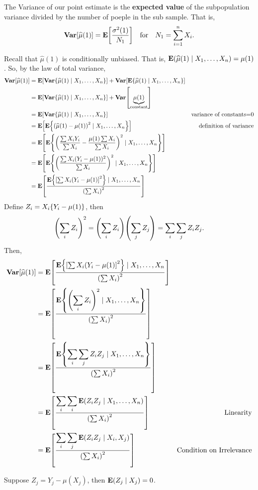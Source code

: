 \begin{clm}
	The Variance of our point estimate is the \textbf{expected value} of the subpopulation variance divided by the number of poeple in the sub sample. That is, \[\vb{Var}\qty[\widehat\mu(1)]=\vb{E}\qty[\dfrac{\sigma^2(1)}{N_1}]\quad\text{for}\quad N_1=\sum_{i=1}^nX_i.\]	
\end{clm}
\begin{prf}
	Recall that $\hat\mu(1)$ is conditionally unbiased. That is, $\vb{E}\qty(\widehat\mu(1)\mid X_1,\dots,X_n)=\mu(1)$. So, by the law of total variance, 
	\begin{align*}
		\vb{Var}\qty[\widehat\mu(1)]&=\vb{E}\qty[\vb{Var}\qty{\widehat\mu(1)\mid X_1,\dots,X_n}]+\vb{Var}\qty[\vb{E}\qty{\widehat\mu(1)\mid X_1,\dots,X_n}]\\
		&=\vb{E}\qty[\vb{Var}\qty{\widehat\mu(1)\mid X_1,\dots,X_n}]+\vb{Var}\qty[\underbrace{\mu(1)}_\text{constant}]\\
		&=\vb{E}\qty[\vb{Var}\qty{\widehat\mu(1)\mid X_1,\dots,X_n}]&\text{variance of constants=0}\\
		&=\vb{E}\qty[\vb{E}\qty{\qty(\widehat\mu(1)-\mu(1))^2\mid X_1,\dots,X_n}]&\text{definition of variance}\\
		&=\vb{E}\qty[\vb{E}\qty{\qty(\dfrac{\sum X_iY_i}{\sum X_i}-\dfrac{\mu(1)\sum X_i}{\sum X_i})^2\mid X_1,\dots,X_n}]\\
		&=\vb{E}\qty[\vb{E}\qty{\qty(\dfrac{\sum X_i(Y_i-\mu(1))^2}{\sum X_i})^2\mid X_1,\dots,X_n}]\\
		&=\vb{E}\qty[\dfrac{\vb{E}\qty{\qty[\sum X_i(Y_i-\mu(1)]^2}\mid X_1,\dots,X_n}{\qty(\sum X_i)^2}]
	\end{align*}
	Define $Z_i=X_i\qty{Y_i-\mu(1)}$, then \[\qty(\sum_iZ_i)^2=\qty(\sum_iZ_i)\qty(\sum_jZ_j)=\sum_i\sum_jZ_iZ_j.\] Then, \begin{align*}
		\vb{Var}\qty[\widehat\mu(1)]&=\vb{E}\qty[\dfrac{\vb{E}\qty{\qty[\sum X_i(Y_i-\mu(1)]^2}\mid X_1,\dots,X_n}{\qty(\sum X_i)^2}]\\
		&=\vb{E}\qty[\dfrac{\displaystyle\vb{E}\qty{\qty(\sum_iZ_i)^2\mid X_1,\dots,X_n}}{\qty(\sum X_i)^2}]\\
		&=\vb{E}\qty[\dfrac{\displaystyle\vb{E}\qty{\sum_i\sum_jZ_iZ_j\mid X_1,\dots,X_n}}{\qty(\sum X_i)^2}]\\
		&=\vb{E}\qty[\dfrac{\displaystyle\sum_i\sum_i\vb{E}\qty(Z_iZ_j\mid X_1,\dots,X_n)}{\qty(\sum X_i)^2}]&\text{Linearity}\\
		&=\vb{E}\qty[\dfrac{\displaystyle\sum_i\sum_j\vb{E}\qty(Z_iZ_j\mid X_i,X_j)}{\qty(\sum X_i)^2}]&\text{Condition on Irrelevance}
	\end{align*}
	\begin{lem*}
		Suppose $Z_j=Y_j-\mu(X_j)$, then $\vb{E}\qty(Z_j\mid X_j)=0$.
		\begin{prf*}

\end{prf*}
\end{lem*}
\end{prf}
